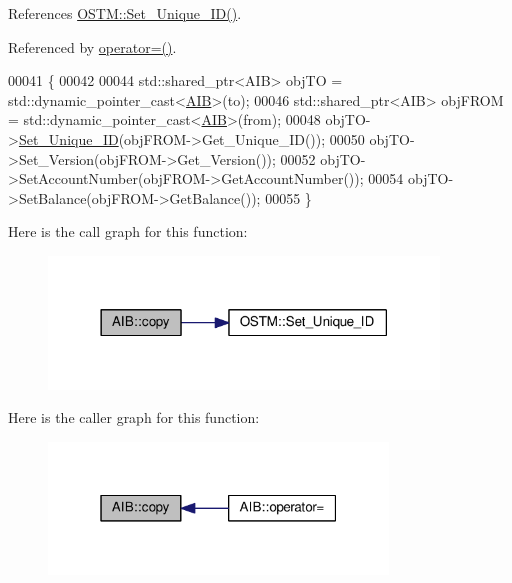 References \hyperlink{_o_s_t_m_8cpp_source_l00075}{O\+S\+T\+M\+::\+Set\+\_\+\+Unique\+\_\+\+I\+D()}.



Referenced by \hyperlink{_a_i_b_8h_source_l00078}{operator=()}.


\begin{DoxyCode}
00041                                                               \{
00042 
00044     std::shared\_ptr<AIB> objTO = std::dynamic\_pointer\_cast<\hyperlink{class_a_i_b}{AIB}>(to);
00046     std::shared\_ptr<AIB> objFROM = std::dynamic\_pointer\_cast<\hyperlink{class_a_i_b}{AIB}>(from);
00048     objTO->\hyperlink{class_o_s_t_m_ab5019a32185631c08abbf826422f2d93_ab5019a32185631c08abbf826422f2d93}{Set\_Unique\_ID}(objFROM->Get\_Unique\_ID());
00050     objTO->Set\_Version(objFROM->Get\_Version());
00052     objTO->SetAccountNumber(objFROM->GetAccountNumber());
00054     objTO->SetBalance(objFROM->GetBalance());
00055 \}
\end{DoxyCode}


Here is the call graph for this function\+:\nopagebreak
\begin{figure}[H]
\begin{center}
\leavevmode
\includegraphics[width=294pt]{class_a_i_b_ad76f25ce86cb42028440f41c371903e0_ad76f25ce86cb42028440f41c371903e0_cgraph}
\end{center}
\end{figure}




Here is the caller graph for this function\+:\nopagebreak
\begin{figure}[H]
\begin{center}
\leavevmode
\includegraphics[width=256pt]{class_a_i_b_ad76f25ce86cb42028440f41c371903e0_ad76f25ce86cb42028440f41c371903e0_icgraph}
\end{center}
\end{figure}


